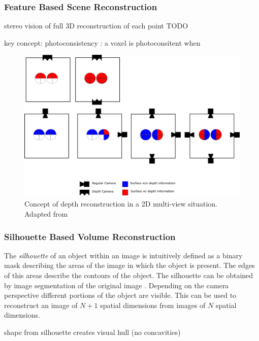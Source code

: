 \subsubsection{Feature Based Scene Reconstruction} 
stereo vision
of full \ac{3D} reconstruction of each point
TODO

key concept: photoconsistency : a voxel is photoconsitent when 



\begin{figure}[hbt]
	\centering
	\includegraphics[width=1.0\textwidth, keepaspectratio]{resources/multiview}
	\caption{\label{fig:sota:mulitviewtop}Concept of depth reconstruction in a 2D multi-view situation.
	Adapted from \textcite[][]{sonaten2011volume}}
\end{figure}

\subsubsection{Silhouette Based Volume Reconstruction}

The \emph{silhouette} of an object within an image is intuitively defined 
as a binary mask describing the areas of the image in which the object is present. 
The edges of this areas describe the contours of the object.
The silhouette can be obtained by image segmentation of the original image \autocite[][Chap.~2]{zhang2017imageanalysis}.
Depending on the camera perspective different portions of the object are visible.
This can be used to reconstruct an image of $N+1$ spatial dimensions from images of $N$ spatial dimensions.



shape from silhouette creates visual hull (no concavities)
\autocite[][]{laurentini1994hull}

